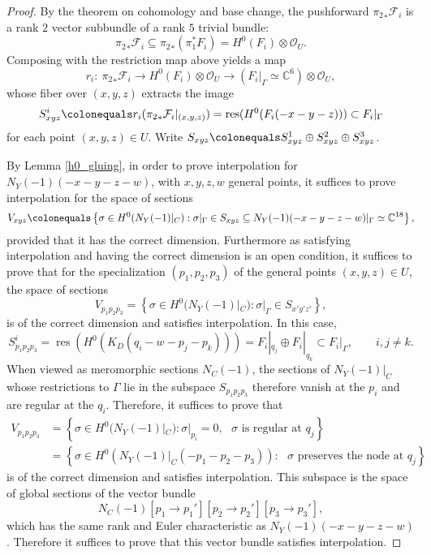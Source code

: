 \documentclass[11pt]{amsart}
\newcommand{\cc}{\mathbb{C}}
\renewcommand{\O}{\mathcal{O}}
\newcommand{\F}{\mathcal{F}}
\newcommand{\res}{\operatorname{res}}
\theoremstyle{definition}
\theoremstyle{remark}
\begin{document}
\begin{proof}
By the theorem on cohomology and base change, the pushforward ${\pi_2}_* \F_i$ is a rank $2$ vector subbundle of a rank $5$ trivial bundle:
\[{\pi_2}_*\F_i \subseteq {\pi_2}_*(\pi_1^*F_i) = H^0(F_i) \otimes\O_U. \]
Composing with the restriction map above yields a map
\[r_i \colon  \ {\pi_2}_* \F_i \to H^0(F_i) \otimes \O_U \to (F_i|_\Gamma \simeq \cc^6) \otimes \O_U, \]
whose fiber over $(x, y, z)$ extracts the image 
\[S^i_{xyz} \colonequals r_i({\pi_2}_* \F_i|_{(x,y,z)}) =  \res(H^0(F_i(-x-y-z))) \subset F_i|_{\Gamma}\] 
for each point $(x,y,z) \in U$.  Write $S_{xyz} \colonequals S^1_{xyz} \oplus S^2_{xyz} \oplus S^3_{xyz}$.

By Lemma \ref{h0_gluing}, in order to prove interpolation for $N_Y(-1)(-x-y-z-w)$, with $x,y,z,w$ general points, it suffices to prove interpolation for the space of sections
\[V_{xyz} \colonequals \left\{\sigma \in H^0(N_Y(-1)|_C) : \sigma|_\Gamma \in S_{xyz} \subseteq N_Y(-1)(-x-y-z-w)|_\Gamma \simeq \cc^{18} \right\}, \]
provided that it has the correct dimension.  Furthermore as satisfying interpolation and having the correct dimension is an open condition, it suffices to prove that 
for the specialization $(p_1, p_2, p_3)$ of the general points $(x,y,z)\in U$, the space of sections
\[V_{p_1p_2p_3} = \left \{\sigma \in H^0(N_Y(-1)|_C) : \sigma|_\Gamma \in S_{x'y'z'}  \right\}, \]
is of the correct dimension and satisfies interpolation.  In this case, 
\[S^i_{p_1p_2p_3} = \res(H^0(K_D(q_i - w -p_j-p_k))) = F_i|_{q_j} \oplus F_i|_{q_k} \subset F_i|_{\Gamma}, \qquad  i,j \neq k.\]
When viewed as meromorphic sections $N_C(-1)$,
the sections of $N_Y(-1)|_C$ whose restrictions to $\Gamma$ lie in the subspace $S_{p_1p_2p_3}$ therefore vanish at the $p_i$ and are regular at the $q_i$.
Therefore, it suffices to prove that
\begin{align*}
V_{p_1p_2p_3} &= \left\{ \sigma \in H^0(N_Y(-1)|_C) : \sigma|_{p_i} = 0, \text{ $\sigma$ is regular at $q_j$} \right\} \\
&=  \left\{ \sigma \in H^0(N_Y(-1)|_C(-p_1-p_2-p_3)) :  \text{ $\sigma$ preserves the node at $q_j$} \right\}
\end{align*}
is of the correct dimension and satisfies interpolation.  This subspace is the space of global sections of the vector bundle
\[N_C(-1)[p_1 \to p_1'][p_2 \to p_2'][p_3 \to p_3'],\]
which has the same rank and Euler characteristic as $N_Y(-1)(-x-y-z-w)$.  Therefore it suffices to prove that this vector bundle satisfies interpolation.

\end{proof}
\end{document}
